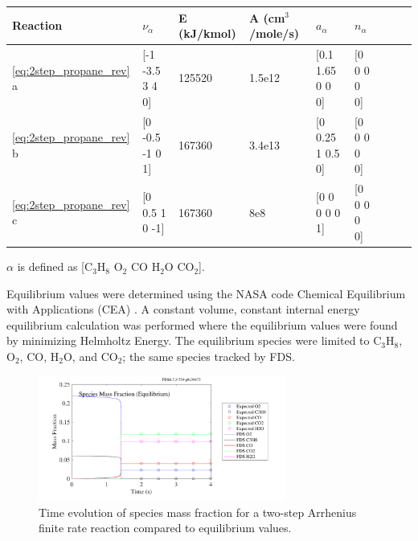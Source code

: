 \documentclass[11pt]{book}
\begin{document}
\begin{center}
\begin{tabular}{|l|l|l|l|l|l|l|l|l|}
\hline Reaction & $\nu_{\alpha}$ & E (kJ/kmol) & A (cm$^3$/mole/s) & $a_{\alpha}$ & $n_{\alpha}$  \\ \hline \hline
\ref{eq:2step_propane_rev} a & [-1 -3.5 3 4 0] & 125520 & 1.5e12 & [0.1 1.65 0 0 0] & [0 0 0 0 0] \\ \hline
\ref{eq:2step_propane_rev} b & [0 -0.5 -1 0 1] & 167360 & 3.4e13 & [0 0.25 1 0.5 0] & [0 0 0 0 0] \\ \hline
\ref{eq:2step_propane_rev} c & [0 0.5 1 0 -1]  & 167360 & 8e8    & [0 0 0 0 0 1]    & [0 0 0 0 0] \\ \hline
\end{tabular}
\vskip8pt
$\alpha$ is defined as [$\mathrm{C_3H_8}$ $\mathrm{O_2}$ $\mathrm{CO}$ $\mathrm{H_2O}$ $\mathrm{CO_2}$].
\end{center}
Equilibrium values were determined using the NASA code Chemical Equilibrium with Applications (CEA) \cite{Gordon:1994}. A constant volume, constant internal energy equilibrium calculation was performed where the equilibrium values were found by minimizing Helmholtz Energy. The equilibrium species were limited to $\mathrm{C_3H_8}$, $\mathrm{O_2}$, $\mathrm{CO}$, $\mathrm{H_2O}$, and $\mathrm{CO_2}$; the same species tracked by FDS.

\begin{figure}[ht]
\begin{center}
\includegraphics[width=3.2in]{SCRIPT_FIGURES/ReactionRate_Equilibrium_Species}
\end{center}
\caption[Species Evolution in Finite Rate Reaction]{Time evolution of species mass fraction for a two-step Arrhenius finite rate reaction compared to equilibrium values.}
\label{fig:Arrhenius_2Order_1stepb}
\end{figure}
\end{document}
